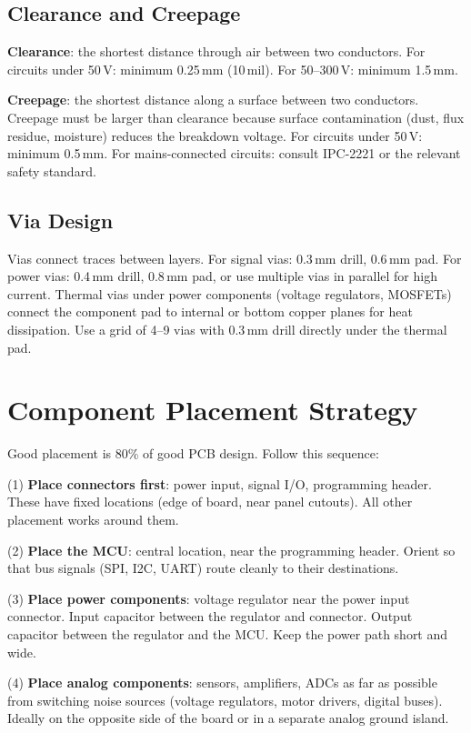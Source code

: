 \documentclass[11pt,letterpaper,twoside,openany]{book}
\begin{document}
\subsection{Clearance and Creepage}
\textbf{Clearance}: the shortest distance through air between two conductors. For circuits under 50\,V: minimum 0.25\,mm (10\,mil). For 50--300\,V: minimum 1.5\,mm.

\textbf{Creepage}: the shortest distance along a surface between two conductors. Creepage must be larger than clearance because surface contamination (dust, flux residue, moisture) reduces the breakdown voltage. For circuits under 50\,V: minimum 0.5\,mm. For mains-connected circuits: consult IPC-2221 or the relevant safety standard.

\subsection{Via Design}
Vias connect traces between layers. For signal vias: 0.3\,mm drill, 0.6\,mm pad. For power vias: 0.4\,mm drill, 0.8\,mm pad, or use multiple vias in parallel for high current. Thermal vias under power components (voltage regulators, MOSFETs) connect the component pad to internal or bottom copper planes for heat dissipation. Use a grid of 4--9 vias with 0.3\,mm drill directly under the thermal pad.

\section{Component Placement Strategy}
Good placement is 80\% of good PCB design. Follow this sequence:

(1) \textbf{Place connectors first}: power input, signal I/O, programming header. These have fixed locations (edge of board, near panel cutouts). All other placement works around them.

(2) \textbf{Place the MCU}: central location, near the programming header. Orient so that bus signals (SPI, I2C, UART) route cleanly to their destinations.

(3) \textbf{Place power components}: voltage regulator near the power input connector. Input capacitor between the regulator and connector. Output capacitor between the regulator and the MCU. Keep the power path short and wide.

(4) \textbf{Place analog components}: sensors, amplifiers, ADCs as far as possible from switching noise sources (voltage regulators, motor drivers, digital buses). Ideally on the opposite side of the board or in a separate analog ground island.
\end{document}
